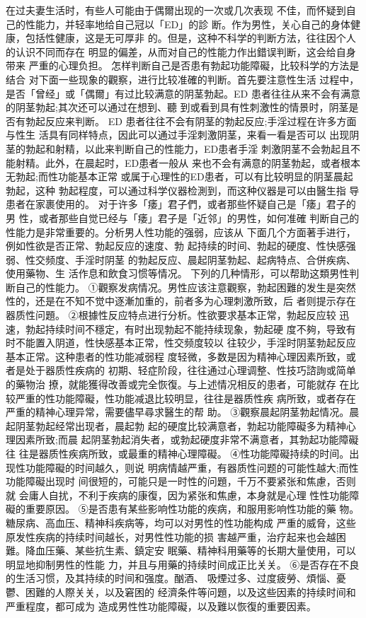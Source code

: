 \documentclass[12pt,UTF8]{ctexbook}
\begin{document}
在过夫妻生活时，有些人可能由于偶爾出现的一次或几次表现
不佳，而怀疑到自己的性能力，并轻率地给自己冠以「ED」的診
断。作为男性，关心自己的身体健康，包括性健康，这是无可厚非
的。但是，这种不科学的判断方法，往往因个人的认识不同而存在
明显的偏差，从而对自己的性能力作出錯误判断，这会给自身带来
严重的心理负担。
怎样判断自己是否患有勃起功能障礙，比较科学的方法是结合
对下面一些现象的觀察，进行比较准確的判断。首先要注意性生活
过程中，是否「曾经」或「偶爾」有过比较满意的阴茎勃起。ED
患者往往从来不会有满意的阴茎勃起;其次还可以通过在想到、聽
到或看到具有性刺激性的情景时，阴茎是否有勃起反应来判断。
ED 患者往往不会有阴茎的勃起反应;手淫过程在许多方面与性生
活具有同样特点，因此可以通过手淫刺激阴茎，来看一看是否可以
出现阴茎的勃起和射精，以此来判断自己的性能力，ED患者手淫
刺激阴茎不会勃起且不能射精。此外，在晨起时，ED患者一般从
来也不会有满意的阴茎勃起，或者根本无勃起;而性功能基本正常
或属于心理性的ED患者，可以有比较明显的阴茎晨起勃起，这种
勃起程度，可以通过科学仪器检測到，而这种仪器是可以由醫生指
导患者在家裹使用的。
对于许多「痿」君子們，或者那些怀疑自己是「痿」君子的男
性，或者那些自觉已经与「痿」君子是「近邻」的男性，如何准確
判断自己的性能力是非常重要的。分析男人性功能的强弱，应该从
下面几个方面著手进行，例如性欲是否正常、勃起反应的速度、勃
起持续的时间、勃起的硬度、性快感强弱、性交频度、手淫时阴茎
的勃起反应、晨起阴茎勃起、起病特点、合併疾病、使用藥物、生
活作息和飲食习惯等情况。
下列的几种情形，可以帮助这類男性判断自己的性能力。
①觀察发病情况。男性应该注意觀察，勃起困難的发生是突然
性的，还是在不知不觉中逐漸加重的，前者多为心理刺激所致，后
者则提示存在器质性问題。
②根據性反应特点进行分析。性欲要求基本正常，勃起反应较
迅速，勃起持续时间不穩定，有时出现勃起不能持续现象，勃起硬
度不夠，导致有时不能置入阴道，性快感基本正常，性交频度较以
往较少，手淫时阴茎勃起反应基本正常。这种患者的性功能减弱程
度轻微，多数是因为精神心理因素所致，或者是处于器质性疾病的
初期、轻症阶段，往往通过心理调整、性技巧諮詢或简单的藥物治
撩，就能獲得改善或完全恢復。与上述情况相反的患者，可能就存
在比较严重的性功能障礙，性功能减退比较明显，往往是器质性疾
病所致，或者存在严重的精神心理异常，需要儘早尋求醫生的帮
助。
③觀察晨起阴茎勃起情况。晨起阴茎勃起经常出现者，晨起勃
起的硬度比较满意者，勃起功能障礙多为精神心理因素所致;而晨
起阴茎勃起消失者，或勃起硬度非常不满意者，其勃起功能障礙往
往是器质性疾病所致，或最重的精神心理障礙。
④性功能障礙持续的时间。出现性功能障礙的时间越久，则说
明病情越严重，有器质性问题的可能性越大;而性功能障礙出现时
间很短的，可能只是一时性的问題，千万不要紧张和焦慮，否则就
会庸人自扰，不利于疾病的康復，因为紧张和焦慮，本身就是心理
性性功能障礙的重要原因。
⑤是否患有某些影响性功能的疾病，和服用影响性功能的藥
物。糖尿病、高血压、精神科疾病等，均可以对男性的性功能构成
严重的威脅，这些原发性疾病的持续时间越长，对男性性功能的损
害越严重，治疗起来也会越困難。降血压藥、某些抗生素、鎮定安
眠藥、精神科用藥等的长期大量使用，可以明显地抑制男性的性能
力，并且与用藥的持续时间成正比关关。
⑥是否存在不良的生活习惯，及其持续的时间和强度。酗酒、
吸煙过多、过度疲勞、煩惱、憂鬱、困難的人際关关，以及窘困的
经濟条件等问題，以及这些因素的持续时间和严重程度，都可成为
造成男性性功能障礙，以及難以恢復的重要因素。
\end{document}
